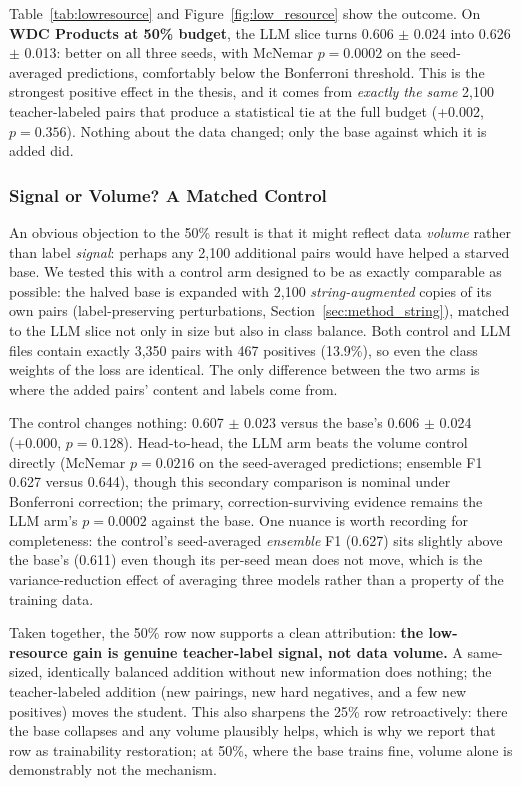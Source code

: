 \documentclass[a4paper,oneside,bibliography=totoc]{scrbook}
\begin{document}
Table~\ref{tab:lowresource} and Figure~\ref{fig:low_resource} show the outcome. On \textbf{WDC Products at 50\% budget}, the LLM slice turns 0.606 $\pm$ 0.024 into 0.626 $\pm$ 0.013: better on all three seeds, with McNemar $p = 0.0002$ on the seed-averaged predictions, comfortably below the Bonferroni threshold. This is the strongest positive effect in the thesis, and it comes from \emph{exactly the same} 2{,}100 teacher-labeled pairs that produce a statistical tie at the full budget (+0.002, $p = 0.356$). Nothing about the data changed; only the base against which it is added did.

\subsubsection*{Signal or Volume? A Matched Control}
\label{sec:iter_lowresource_control}

An obvious objection to the 50\% result is that it might reflect data \emph{volume} rather than label \emph{signal}: perhaps any 2{,}100 additional pairs would have helped a starved base. We tested this with a control arm designed to be as exactly comparable as possible: the halved base is expanded with 2{,}100 \emph{string-augmented} copies of its own pairs (label-preserving perturbations, Section~\ref{sec:method_string}), matched to the LLM slice not only in size but also in class balance. Both control and LLM files contain exactly 3{,}350 pairs with 467 positives (13.9\%), so even the class weights of the loss are identical. The only difference between the two arms is where the added pairs' content and labels come from.

The control changes nothing: 0.607 $\pm$ 0.023 versus the base's 0.606 $\pm$ 0.024 (+0.000, $p = 0.128$). Head-to-head, the LLM arm beats the volume control directly (McNemar $p = 0.0216$ on the seed-averaged predictions; ensemble F1 0.627 versus 0.644), though this secondary comparison is nominal under Bonferroni correction; the primary, correction-surviving evidence remains the LLM arm's $p = 0.0002$ against the base. One nuance is worth recording for completeness: the control's seed-averaged \emph{ensemble} F1 (0.627) sits slightly above the base's (0.611) even though its per-seed mean does not move, which is the variance-reduction effect of averaging three models rather than a property of the training data.

Taken together, the 50\% row now supports a clean attribution: \textbf{the low-resource gain is genuine teacher-label signal, not data volume.} A same-sized, identically balanced addition without new information does nothing; the teacher-labeled addition (new pairings, new hard negatives, and a few new positives) moves the student. This also sharpens the 25\% row retroactively: there the base collapses and any volume plausibly helps, which is why we report that row as trainability restoration; at 50\%, where the base trains fine, volume alone is demonstrably not the mechanism.
\end{document}
